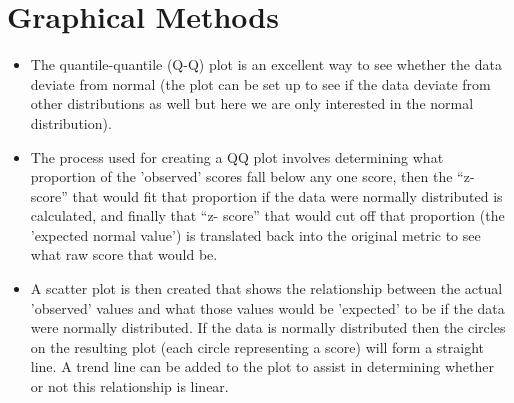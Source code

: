 \documentclass[a4paper,12pt]{article}
\begin{document}
 
 
\section*{Graphical Methods}
\begin{itemize} 
\item The quantile-quantile (Q-Q) plot is an excellent way to see whether the data deviate from normal (the plot can be set up to see if the data 
deviate from other distributions as well but here we are only interested in the normal distribution). 
\item The process used for creating a QQ plot involves determining what proportion of the 'observed' scores fall below any one score, then the “z- 
score” that would fit that proportion if the data were normally distributed is calculated, and finally that “z- score” that would cut off that proportion 
(the 'expected normal value') is translated back into the original metric to see what raw score that would be. 
 
\item A scatter plot is then created that shows the relationship between the actual 'observed' values and what those values would be 'expected' to be 
if the data were normally distributed. If the data is normally distributed then the circles on the resulting plot (each circle representing a score) will form a straight line. 
A trend line can be added to the plot to assist in determining whether or not this relationship is linear. 
\end{itemize}
\end{document}

